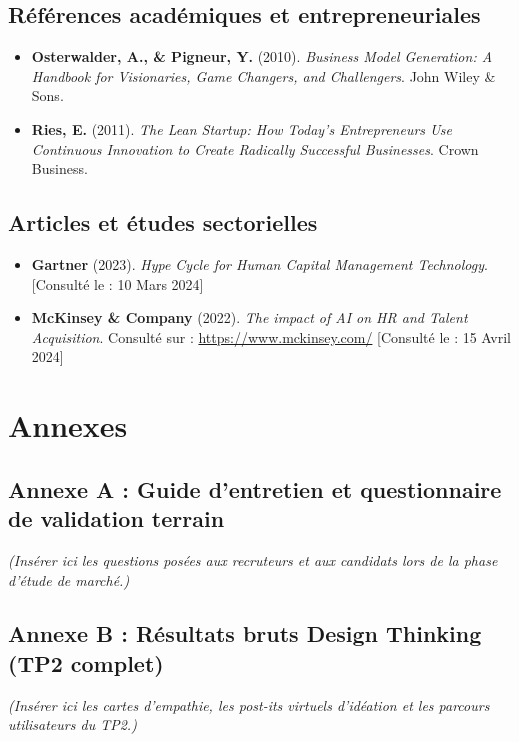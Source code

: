 \documentclass[12pt,a4paper]{report}
\begin{document}
\begin{itemize}
\section*{Références académiques et entrepreneuriales}
\begin{itemize}
    \item \textbf{Osterwalder, A., \& Pigneur, Y.} (2010). \textit{Business Model Generation: A Handbook for Visionaries, Game Changers, and Challengers}. John Wiley \& Sons.
    \item \textbf{Ries, E.} (2011). \textit{The Lean Startup: How Today's Entrepreneurs Use Continuous Innovation to Create Radically Successful Businesses}. Crown Business.
\end{itemize}

\section*{Articles et études sectorielles}
\begin{itemize}
    \item \textbf{Gartner} (2023). \textit{Hype Cycle for Human Capital Management Technology}. [Consulté le : 10 Mars 2024]
    \item \textbf{McKinsey \& Company} (2022). \textit{The impact of AI on HR and Talent Acquisition}. Consulté sur : \url{https://www.mckinsey.com/} [Consulté le : 15 Avril 2024]
\end{itemize}

\appendix
\chapter*{Annexes}

\section*{Annexe A : Guide d'entretien et questionnaire de validation terrain}
\textit{(Insérer ici les questions posées aux recruteurs et aux candidats lors de la phase d'étude de marché.)}

\section*{Annexe B : Résultats bruts Design Thinking (TP2 complet)}
\textit{(Insérer ici les cartes d'empathie, les post-its virtuels d'idéation et les parcours utilisateurs du TP2.)}


\end{itemize}
\end{document}
